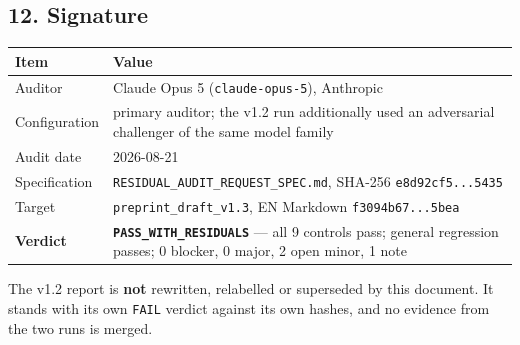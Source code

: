\documentclass[
  9pt,
  a4paper,
]{article}
\newcounter{none} %
\begin{document}
\subsection{12. Signature}\label{12-signature}

{\def\LTcaptype{none} %
\begin{longtable}[]{@{}ll@{}}
\toprule\noalign{}
Item & Value \\
\midrule\noalign{}
\endhead
\bottomrule\noalign{}
\endlastfoot
Auditor & Claude Opus 5 (\texttt{claude-opus-5}), Anthropic \\
Configuration & primary auditor; the v1.2 run additionally used an
adversarial challenger of the same model family \\
Audit date & 2026-08-21 \\
Specification & \texttt{RESIDUAL\_AUDIT\_REQUEST\_SPEC.md}, SHA-256
\texttt{e8d92cf5...5435} \\
Target & \texttt{preprint\_draft\_v1.3}, EN Markdown
\texttt{f3094b67...5bea} \\
\textbf{Verdict} & \textbf{\texttt{PASS\_WITH\_RESIDUALS}} --- all 9
controls pass; general regression passes; 0 blocker, 0 major, 2 open
minor, 1 note \\
\end{longtable}
}

The v1.2 report is \textbf{not} rewritten, relabelled or superseded by
this document. It stands with its own \texttt{FAIL} verdict against its
own hashes, and no evidence from the two runs is merged.
\end{document}
